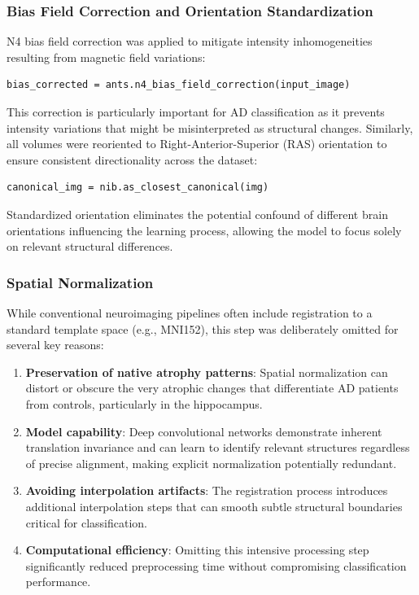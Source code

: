 \documentclass[12pt, a4paper]{article}
\begin{document}
\subsubsection{Bias Field Correction and Orientation Standardization}

N4 bias field correction was applied to mitigate intensity inhomogeneities resulting from magnetic field variations:

\begin{verbatim}
bias_corrected = ants.n4_bias_field_correction(input_image)
\end{verbatim}

This correction is particularly important for AD classification as it prevents intensity variations that might be misinterpreted as structural changes. Similarly, all volumes were reoriented to Right-Anterior-Superior (RAS) orientation to ensure consistent directionality across the dataset:

\begin{verbatim}
canonical_img = nib.as_closest_canonical(img)
\end{verbatim}

Standardized orientation eliminates the potential confound of different brain orientations influencing the learning process, allowing the model to focus solely on relevant structural differences.

\subsubsection{Spatial Normalization}

While conventional neuroimaging pipelines often include registration to a standard template space (e.g., MNI152), this step was deliberately omitted for several key reasons:

\begin{enumerate}
    \item \textbf{Preservation of native atrophy patterns}: Spatial normalization can distort or obscure the very atrophic changes that differentiate AD patients from controls, particularly in the hippocampus.
    
    \item \textbf{Model capability}: Deep convolutional networks demonstrate inherent translation invariance and can learn to identify relevant structures regardless of precise alignment, making explicit normalization potentially redundant.
    
    \item \textbf{Avoiding interpolation artifacts}: The registration process introduces additional interpolation steps that can smooth subtle structural boundaries critical for classification.
    
    \item \textbf{Computational efficiency}: Omitting this intensive processing step significantly reduced preprocessing time without compromising classification performance.
\end{enumerate}
\end{document}
